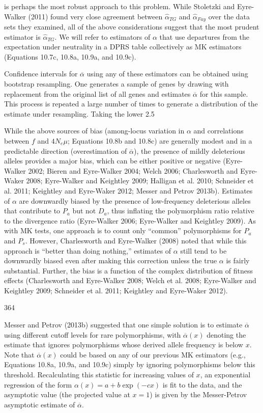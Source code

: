 \documentclass{article}
\begin{document}
is perhaps the most robust approach to this problem. While Stoletzki and Eyre-Walker (2011) found very close agreement between  $ \widehat{\alpha}_{TG} $ and  $ \widehat{\alpha}_{Fay} $ over the data sets they examined, all of the above considerations suggest that the most prudent estimator is  $ \widehat{\alpha}_{TG} $. We will refer to estimators of  $ \alpha $ that use departures from the expectation under neutrality in a DPRS table collectively as MK estimators (Equations 10.7c, 10.8a, 10.9a, and 10.9c).

Confidence intervals for  $ \overline{\alpha} $ using any of these estimators can be obtained using bootstrap resampling. One generates a sample of genes by drawing with replacement from the original list of all genes and estimates  $ \overline{\alpha} $ for this sample. This process is repeated a large number of times to generate a distribution of the estimate under resampling. Taking the lower 2.5%

While the above sources of bias (among-locus variation in  $ \alpha $ and correlations between  $ f $ and  $ 4N_e\mu $; Equations 10.8b and 10.8c) are generally modest and in a predictable direction (overestimation of  $ \overline{\alpha} $), the presence of mildly deleterious alleles provides a major bias, which can be either positive or negative (Eyre-Walker 2002; Bieren and Eyre-Walker 2004; Welch 2006; Charlesworth and Eyre-Waker 2008; Eyre-Walker and Keightley 2009; Halligan et al. 2010; Schneider et al. 2011; Keightley and Eyre-Waker 2012; Messer and Petrov 2013b). Estimates of  $ \alpha $ are downwardly biased by the presence of low-frequency deleterious alleles that contribute to  $ P_a $ but not  $ D_a $, thus inflating the polymorphism ratio relative to the divergence ratio (Eyre-Walker 2006; Eyre-Walker and Keightley 2009). As with MK tests, one approach is to count only “common” polymorphisms for  $ P_a $ and  $ P_s $. However, Charlesworth and Eyre-Walker (2008) noted that while this approach is “better than doing nothing,” estimates of  $ \alpha $ still tend to be downwardly biased even after making this correction unless the true  $ \alpha $ is fairly substantial. Further, the bias is a function of the complex distribution of fitness effects (Charlesworth and Eyre-Walker 2008; Welch et al. 2008; Eyre-Walker and Keightley 2009; Schneider et al. 2011; Keightley and Eyre-Waker 2012).

364

Messer and Petrov (2013b) suggested that one simple solution is to estimate  $ \overline{\alpha} $ using different cutoff levels for rare polymorphisms, with  $ \overline{\alpha}(x) $ denoting the estimate that ignores polymorphisms whose derived allele frequency is below  $ x $. Note that  $ \overline{\alpha}(x) $ could be based on any of our previous MK estimators (e.g., Equations 10.8a, 10.9a, and 10.9c) simply by ignoring polymorphisms below this threshold. Recalculating this statistic for increasing values of  $ x $, an exponential regression of the form  $ \alpha(x) = a + b \exp(-cx) $ is fit to the data, and the asymptotic value (the projected value at  $ x = 1 $) is given by the Messer-Petrov asymptotic estimate of  $ \overline{\alpha} $.
\end{document}
